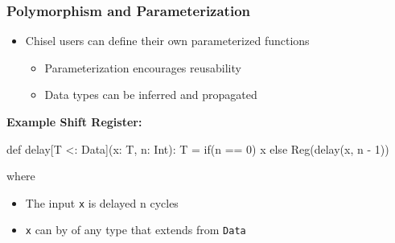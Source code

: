 \documentclass[xcolor=pdflatex,dvipsnames,table]{beamer}
\begin{document}
\begin{frame}[fragile]
\frametitle{Polymorphism and Parameterization}
\begin{itemize}
\item Chisel users can define their own parameterized functions
\begin{itemize}
\item Parameterization encourages reusability
\item Data types can be inferred and propagated
\end{itemize}
\end{itemize}

\textbf{Example Shift Register:}
\begin{scala}
def delay[T <: Data](x: T, n: Int): T = 
  if(n == 0) x else Reg(delay(x, n - 1))
\end{scala}
where
\begin{itemize}
\item The input \verb+x+ is delayed n cycles
\item \verb+x+ can by of any type that extends from \verb+Data+
\end{itemize}

\end{frame}
\end{document}
